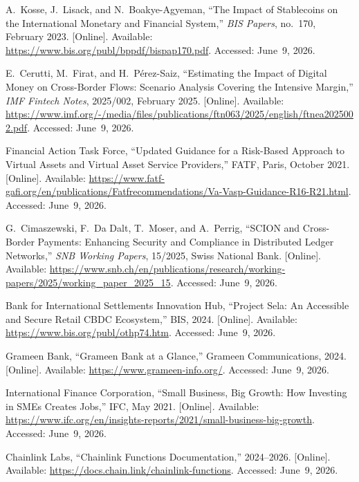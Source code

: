 \documentclass[12pt, a4paper]{report}
\begin{document}
{\begin{enumerate}[label={[\arabic*]}]
\item A.~Kosse, J.~Lisack, and N.~Boakye-Agyeman, ``The Impact of Stablecoins on the International Monetary and Financial System,'' \textit{BIS Papers}, no.~170, February 2023. [Online]. Available: \url{https://www.bis.org/publ/bppdf/bispap170.pdf}. Accessed: June~9, 2026.

\item E.~Cerutti, M.~Firat, and H.~P\'{e}rez-Saiz, ``Estimating the Impact of Digital Money on Cross-Border Flows: Scenario Analysis Covering the Intensive Margin,'' \textit{IMF Fintech Notes}, 2025/002, February 2025. [Online]. Available: \url{https://www.imf.org/-/media/files/publications/ftn063/2025/english/ftnea2025002.pdf}. Accessed: June~9, 2026.

\item Financial Action Task Force, ``Updated Guidance for a Risk-Based Approach to Virtual Assets and Virtual Asset Service Providers,'' FATF, Paris, October 2021. [Online]. Available: \url{https://www.fatf-gafi.org/en/publications/Fatfrecommendations/Va-Vasp-Guidance-R16-R21.html}. Accessed: June~9, 2026.

\item G.~Cimaszewski, F.~Da Dalt, T.~Moser, and A.~Perrig, ``SCION and Cross-Border Payments: Enhancing Security and Compliance in Distributed Ledger Networks,'' \textit{SNB Working Papers}, 15/2025, Swiss National Bank. [Online]. Available: \url{https://www.snb.ch/en/publications/research/working-papers/2025/working_paper_2025_15}. Accessed: June~9, 2026.

\item Bank for International Settlements Innovation Hub, ``Project Sela: An Accessible and Secure Retail CBDC Ecosystem,'' BIS, 2024. [Online]. Available: \url{https://www.bis.org/publ/othp74.htm}. Accessed: June~9, 2026.

\item Grameen Bank, ``Grameen Bank at a Glance,'' Grameen Communications, 2024. [Online]. Available: \url{https://www.grameen-info.org/}. Accessed: June~9, 2026.

\item International Finance Corporation, ``Small Business, Big Growth: How Investing in SMEs Creates Jobs,'' IFC, May 2021. [Online]. Available: \url{https://www.ifc.org/en/insights-reports/2021/small-business-big-growth}. Accessed: June~9, 2026.

\item Chainlink Labs, ``Chainlink Functions Documentation,'' 2024--2026. [Online]. Available: \url{https://docs.chain.link/chainlink-functions}. Accessed: June~9, 2026.


\end{enumerate}}
\end{document}
